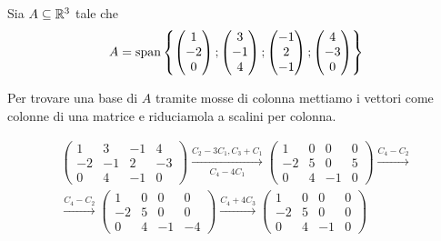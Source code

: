 \begin{example}
    Sia $A \subseteq \mathbb{R}^3$ tale che \[
        A = \operatorname{span}\left\{\begin{pmatrix}
            1 \\ -2 \\ 0
        \end{pmatrix}; \begin{pmatrix}
            3 \\ -1 \\ 4
        \end{pmatrix}; \begin{pmatrix}
            -1 \\ 2 \\ -1
        \end{pmatrix}; \begin{pmatrix}
            4 \\ -3 \\ 0
        \end{pmatrix}\right\}    
    \]

    Per trovare una base di $A$ tramite mosse di colonna mettiamo i vettori come colonne di una matrice e riduciamola a scalini per colonna.

    \begin{align*}
        \begin{pmatrix}
            1 & 3 & -1 & 4 \\ -2 & -1 & 2 & -3 \\ 0 & 4 & -1 & 0
        \end{pmatrix} \xrightarrow[C_4 - 4C_1]{C_2 - 3C_1, C_3 + C_1}
        \begin{pmatrix}
            1 & 0 & 0 & 0 \\ -2 & 5 & 0 & 5 \\ 0 & 4 & -1 & 0
        \end{pmatrix} \xrightarrow[]{C_4 - C_2} \\
        \xrightarrow[]{C_4 - C_2}\begin{pmatrix}
            1 & 0 & 0 & 0 \\ -2 & 5 & 0 & 0 \\ 0 & 4 & -1 & -4
        \end{pmatrix} \xrightarrow[]{C_4 + 4C_3}
        \begin{pmatrix}
            1 & 0 & 0 & 0 \\ -2 & 5 & 0 & 0 \\ 0 & 4 & -1 & 0
        \end{pmatrix}
    \end{align*}


\end{example}
